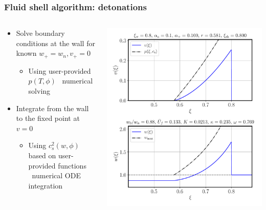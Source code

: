 \begin{frame}
    \frametitle{Fluid shell algorithm: detonations}
    \begin{columns}
    \begin{column}{0.6\textwidth}
        \begin{itemize}
            \item Solve boundary conditions at the wall for known $w_+=w_n, v_+=0$
            \begin{itemize}
                \item Using user-provided $p(T,\phi)$ \textrightarrow \ numerical solving
            \end{itemize}
            \item Integrate from the wall to the fixed point at $v=0$
            \begin{itemize}
                \item Using $c_s^2(w,\phi)$ based on user-provided functions \textrightarrow \ numerical ODE integration
            \end{itemize}
        \end{itemize}
    \end{column}
    \begin{column}{0.4\textwidth}
        \includegraphics[width=\textwidth]{../fig/shell_plot_vw_08_alphan_01_review}
    \end{column}
    \end{columns}
\end{frame}


